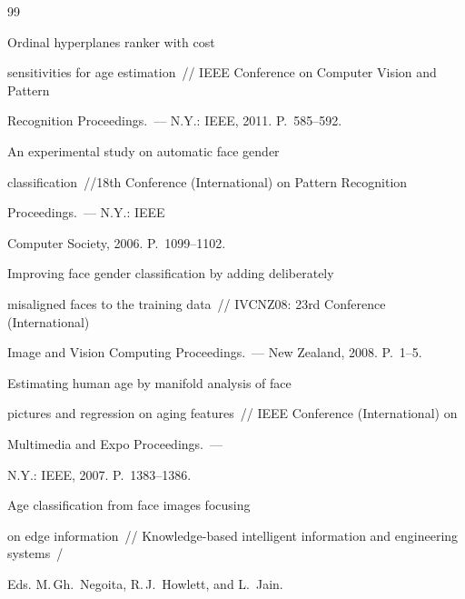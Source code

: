  {\small\frenchspacing

{\baselineskip=10.4pt


\begin{thebibliography}{99}




 Ordinal hyperplanes ranker with cost

sensitivities for age estimation~/\!\!/ IEEE Conference on Computer Vision and Pattern

Recognition Proceedings.~--- N.Y.: IEEE, 2011. P.~585--592.




 An experimental study on automatic face gender

classification~/\!\!/18th Conference (International) on Pattern Recognition

Proceedings.~--- N.Y.: IEEE

Computer Society, 2006. P.~1099--1102.




 Improving face gender classification by adding deliberately

misaligned faces to the training data~/\!\!/ IVCNZ08: 23rd Conference (International)

Image and Vision Computing  Proceedings.~--- New Zealand, 2008. P.~1--5.




 Estimating human age by manifold analysis of face

pictures and regression on aging features~/\!\!/ IEEE Conference (International) on

Multimedia and Expo Proceedings.~---

N.Y.: IEEE, 2007. P.~1383--1386.




 Age classification from face images focusing

on edge information~/\!\!/ Knowledge-based intelligent information and engineering systems~/

Eds. M.\,Gh.~Negoita, R.\,J.~Howlett, and L.~Jain.


\end{thebibliography}}}
